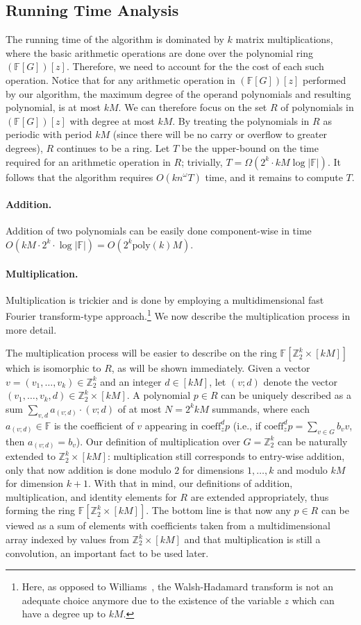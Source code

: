\documentclass{llncs}
\newcommand{\coeff}{\mathrm{coeff}}
\newcommand{\poly}{\mathrm{poly}}
\newcommand{\FF}{\mathbb{F}}
\newcommand{\ZZ}{\mathbb{Z}}
\newcommand{\FG}{{\FF[G]}}
\newcommand{\abs}[1]{\lvert #1 \rvert}
\begin{document}
\subsection{Running Time Analysis}
The running time of the algorithm is dominated by $k$ matrix multiplications, where the basic arithmetic operations are done over the polynomial ring $(\FG)[z]$.  Therefore, we need to account for the the cost of each such operation. Notice that for any arithmetic operation in $(\FG)[z]$ performed by our algorithm, the maximum degree of the operand polynomials and resulting polynomial, is at most $kM$. 
We can therefore focus on the set $R$ of polynomials in $(\FG)[z]$ with degree at most $kM$. By treating the polynomials in $R$ as periodic with period $kM$ (since there will be no carry or overflow to greater degrees), $R$ continues to be a ring. 
Let $T$ be the upper-bound on the time required for an arithmetic operation in $R$; trivially, $T = \Omega(2^k\cdot kM \log\abs{\FF})$. It follows that the algorithm requires $O(k n^\omega T)$ time, and it remains to compute $T$.

\paragraph{Addition.} Addition of two polynomials can be easily done component-wise in time $O(kM \cdot 2^k \cdot \log \abs{\FF}) = O(2^k \poly(k) M)$. 
\paragraph{Multiplication.} Multiplication is trickier and is done by employing a multidimensional fast Fourier transform-type approach.\footnote{Here, as opposed to Williams~\cite{Williams09}, the Walsh-Hadamard transform is not an adequate choice anymore due to the existence of the variable $z$ which can have a degree up to $kM$. } We now describe the multiplication process in more detail.

The multiplication process will be easier to describe on the ring $\FF[\ZZ_2^k\times [kM]]$ which is isomorphic to $R$, as will be shown immediately. Given a vector $v =(v_1,\ldots,v_k) \in \ZZ_2^k$ and an integer $d \in [kM]$, let $(v;d)$ denote the vector $(v_1,\ldots,v_k,d)\in \ZZ_2^k\times [kM]$. A polynomial $p \in R$ can be uniquely described as a sum $\sum_{v,d}a_{(v;d)}\cdot(v;d)$ of at most $N = 2^k kM$ summands, where each $a_{(v;d)} \in \FF$ is the coefficient of $v$ appearing in $\coeff_z^d p$ (i.e.,  if $\coeff_z^d p = \sum_{v \in G} b_v v$, then $a_{(v;d)} = b_v$). Our definition of multiplication over $G=\ZZ_2^k$ can be naturally extended to $\ZZ_2^k\times [kM]$: multiplication still corresponds to entry-wise addition, only that now addition is done modulo $2$ for dimensions $1,\ldots,k$ and modulo $kM$ for dimension $k+1$. With that in mind, our definitions of addition, multiplication, and identity elements for $R$ are extended appropriately, thus forming the ring $\FF[\ZZ_2^k\times [kM]]$. The bottom line is that now any $p \in R$ can be viewed as a sum of elements with coefficients taken from a multidimensional array indexed by values from $\ZZ_2^k\times [kM]$ and that multiplication is still a convolution, an important fact to be used later.
\end{document}
